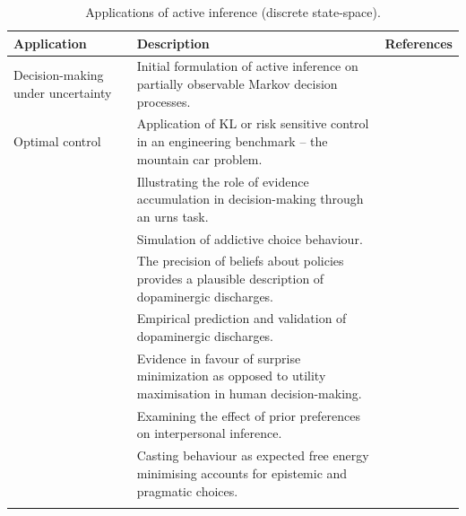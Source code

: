 \documentclass[review,12pt,authoryear]{elsarticle}
\begin{document}
\begin{longtabu} to \textwidth {
    X[2,c]
    X[4,c]
    X[2,c]}
    \caption{Applications of active inference (discrete state-space).} \label{table:1} \\
            \toprule
            Application & Description & References \\
            \midrule
            Decision-making under uncertainty
            & Initial formulation of active inference on partially observable Markov decision processes.
            & \citep{fristonActiveInferenceAgency2012}  \\ \addlinespace[0.3cm]
            Optimal control
            &  {Application of KL or risk sensitive control in an engineering benchmark – the mountain car problem.}
            &  {\citep{fristonWhatValueAccumulated2012,catalBayesianPolicySelection2019}} \\ 
            &	 {Illustrating the role of evidence accumulation in decision-making through an urns task.}
            &	 {\citep{fitzgeraldActiveInferenceEvidence2015, fitzgeraldPrecisionNeuronalDynamics2015} }\\ 
            &  {Simulation of addictive choice behaviour.}
            &  {\citep{schwartenbeckOptimalInferenceSuboptimal2015}} \\ 
            &  {The precision of beliefs about policies provides a plausible description of dopaminergic discharges.}
            &  {\citep{fitzgeraldDopamineRewardLearning2015,fristonAnatomyChoiceDopamine2014}} \\ 
            &	 {Empirical prediction and validation of dopaminergic discharges.}
            &  {\citep{schwartenbeckDopaminergicMidbrainEncodes2015}}\\ 
            &  {Evidence in favour of surprise minimization as opposed to utility maximisation in human decision-making.}
            &  {\citep{schwartenbeckEvidenceSurpriseMinimization2015}}\\ 
            &  {Examining the effect of prior preferences on interpersonal inference.}
            &  {\citep{moutoussisFormalModelInterpersonal2014}}\\  &  {Casting behaviour as expected free energy minimising accounts for epistemic and pragmatic choices.} &  {\citep{fristonActiveInferenceEpistemic2015}}\\ \addlinespace[0.3cm]

\end{longtabu}
\end{document}
